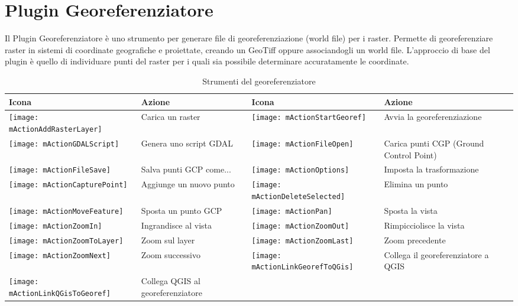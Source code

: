 
\section{Plugin Georeferenziatore}\label{sec:georef}


Il Plugin Georeferenziatore è uno strumento per generare file di georeferenziazione (world file) per i raster. 
Permette di georeferenziare raster in sistemi di coordinate geografiche e proiettate, creando un GeoTiff oppure 
associandogli un world file. L'approccio di base del plugin è quello di individuare punti del raster per i 
quali sia possibile determinare accuratamente le coordinate.


\begin{table}[h]
\begin{tabular}{|m{1cm}|m{6cm}|m{1cm}|m{6cm}|}
	\hline \textbf{Icona} & \textbf{Azione} & \textbf{Icona} &
 \textbf{Azione} \\
 \hline \texttt{[image: mActionAddRasterLayer]} & Carica un raster &
 \texttt{[image: mActionStartGeoref]} & Avvia la georeferenziazione \\
 \hline \texttt{[image: mActionGDALScript]} & Genera uno script GDAL &
 \texttt{[image: mActionFileOpen]} & Carica punti CGP (Ground Control Point) \\
 \hline \texttt{[image: mActionFileSave]} & Salva punti GCP come... &
 \texttt{[image: mActionOptions]} & Imposta la trasformazione \\
 \hline \texttt{[image: mActionCapturePoint]} & Aggiunge un nuovo punto &
 \texttt{[image: mActionDeleteSelected]} & Elimina un punto \\
 \hline \texttt{[image: mActionMoveFeature]} & Sposta un punto GCP &
 \texttt{[image: mActionPan]} & Sposta la vista \\
 \hline \texttt{[image: mActionZoomIn]} & Ingrandisce al vista &
 \texttt{[image: mActionZoomOut]} & Rimpicciolisce la vista \\
 \hline \texttt{[image: mActionZoomToLayer]} & Zoom sul layer &
 \texttt{[image: mActionZoomLast]} & Zoom precedente \\
 \hline \texttt{[image: mActionZoomNext]} & Zoom successivo &
 \texttt{[image: mActionLinkGeorefToQGis]} & Collega il georeferenziatore a QGIS \\
 \hline \texttt{[image: mActionLinkQGisToGeoref]} & Collega QGIS al georeferenziatore  &
 &  \\
\hline
\end{tabular}
\caption{Strumenti del georeferenziatore}\label{tab:georeferencer_tools}
\end{table}

